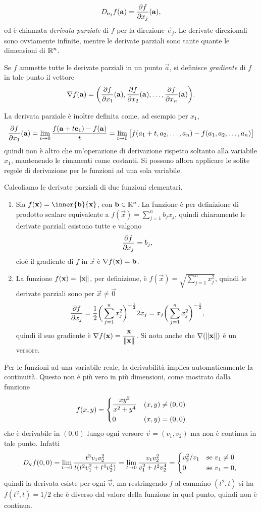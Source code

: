 \[
D_{\mathbf{e}_j}f(\mathbf{a})=\frac{\partial {f}}{\partial {x_j}}(\mathbf{a}),
\]
ed è chiamata \emph{derivata parziale} di $f$ per la direzione $\vec e_j$.
Le derivate direzionali sono ovviamente infinite, mentre le derivate parziali sono tante quante le dimensioni di $\mathbb{R}^n$.
\begin{definizione} \label{d:grad}
Se $f$ ammette tutte le derivate parziali in un punto $\vec a$, si definisce \emph{gradiente} di $f$ in tale punto il vettore
\begin{equation} \label{eq:grad}
\nabla f(\mathbf{a})=\bigg(\frac{\partial {f}}{\partial {x_1}}(\mathbf{a}),\frac{\partial {f}}{\partial {x_2}}(\mathbf{a}),\dots,\frac{\partial {f}}{\partial {x_n}}(\mathbf{a})\bigg).
\end{equation}
\end{definizione}
La derivata parziale è inoltre definita come, ad esempio per $x_1$,
\[
\frac{\partial {f}}{\partial {x_1}}(\mathbf{a})=\lim_{t\to 0}\frac{f(\mathbf{a}+t\mathbf{e}_1)-f(\mathbf{a})}{t}=\lim_{t\to 0}\big[f(a_1+t,a_2,\dots,a_n)-f(a_1,a_2,\dots,a_n)\big]
\]
quindi non è altro che un'operazione di derivazione rispetto soltanto alla variabile $x_1$, mantenendo le rimanenti come costanti. Si possono allora applicare le solite regole di derivazione per le funzioni ad una sola variabile.
\begin{esempio} \label{es:derivate-parziali}
	Calcoliamo le derivate parziali di due funzioni elementari.
	\begin{enumerate}
		\item Sia $f(\vec x)=\inner{\vec b}{\vec x}$, con $\mathbf{b}\in\mathbb{R}^n$. La funzione è per definizione di prodotto scalare equivalente a $f(\vec x)=\sum_{j=1}^nb_jx_j$, quindi chiaramente le derivate parziali esistono tutte e valgono
		\[
		\frac{\partial {f}}{\partial {x_j}}=b_j,
		\]
		cioè il gradiente di $f$ in $\vec x$ è $\nabla f(\mathbf{x})=\mathbf{b}$.
		\item La funzione $f(\mathbf{x})=\lVert\mathbf{x}\rVert$, per definizione, è $f(\vec x)=\sqrt{\sum_{j=1}^nx_j^2}$, quindi le derivate parziali sono per $\vec x\neq\vec 0$
		\[
		\frac{\partial {f}}{\partial {x_j}}=\frac12\bigg(\sum_{j=1}^nx_j^2\bigg)^{-\frac{1}{2}}2x_j=x_j\bigg(\sum_{j=1}^nx_j^2\bigg)^{-\frac{1}{2}},
		\]
		quindi il suo gradiente è $\nabla f(\mathbf{x})=\dfrac{\mathbf{x}}{\lVert\mathbf{x}\rVert}$. Si nota anche che $\nabla(\lVert\mathbf{x}\rVert)$ è un versore.
	\end{enumerate}
\end{esempio}

Per le funzioni ad una variabile reale, la derivabilità implica automaticamente la continuità. Questo non è più vero in più dimensioni, come mostrato dalla funzione
\[
f(x,y)=\begin{dcases}
\frac{xy^2}{x^2+y^4}	&(x,y)\neq(0,0)\\
0					&(x,y)=(0,0)
\end{dcases}
\]
che è derivabile in $(0,0)$ lungo ogni versore $\vec v=(v_1,v_2)$ ma non è continua in tale punto. Infatti
\[
D_{\vec v}f(0,0)=\lim_{t\to 0}\frac{t^3v_1v_2^2}{t(t^2v_1^2+t^4v_2^4)}=\lim_{t\to 0}\frac{v_1v_2^2}{v_1^2+t^2v_2^4}=
\begin{cases*}
v_2^2/v_1	&se $v_1\neq 0$\\
0			&se $v_1=0$,
\end{cases*}
\]
quindi la derivata esiste per ogni $\vec v$, ma restringendo $f$ al cammino $(t^2,t)$ si ha $f(t^2,t)=1/2$ che è diverso dal valore della funzione in quel punto, quindi non è continua.

